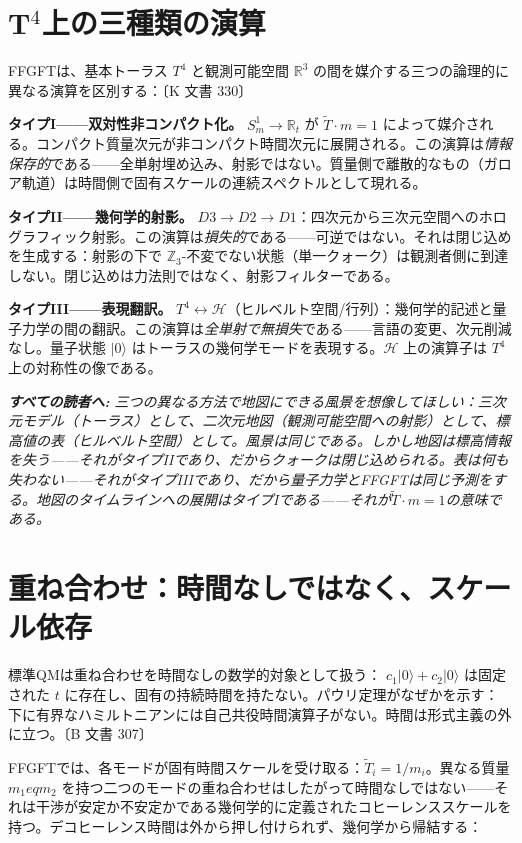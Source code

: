 \documentclass[11pt,openany]{book}
\newenvironment{laierspur}{%
  \par\vspace{4pt}%
  \noindent\small\itshape\color{blue!60!black}%
  \textbf{すべての読者へ:}\enspace\ignorespaces}{%
  \par\vspace{4pt}\normalsize\normalfont\normalcolor}
\begin{document}
\section*{T$^4$上の三種類の演算}

FFGFTは、基本トーラス $T^4$ と観測可能空間 $\mathbb{R}^3$ の間を媒介する三つの論理的に異なる演算を区別する：〔K 文書 330〕

\textbf{タイプI——双対性非コンパクト化。}
$S^1_m \to \mathbb{R}_t$ が $\tilde{T}\cdot m = 1$ によって媒介される。コンパクト質量次元が非コンパクト時間次元に展開される。この演算は\textit{情報保存的}である——全単射埋め込み、射影ではない。質量側で離散的なもの（ガロア軌道）は時間側で固有スケールの連続スペクトルとして現れる。

\textbf{タイプII——幾何学的射影。}
$D3 \to D2 \to D1$：四次元から三次元空間へのホログラフィック射影。この演算は\textit{損失的}である——可逆ではない。それは閉じ込めを生成する：射影の下で $\mathbb{Z}_3$-不変でない状態（単一クォーク）は観測者側に到達しない。閉じ込めは力法則ではなく、射影フィルターである。

\textbf{タイプIII——表現翻訳。}
$T^4 \leftrightarrow \mathcal{H}$（ヒルベルト空間/行列）：幾何学的記述と量子力学の間の翻訳。この演算は\textit{全単射で無損失}である——言語の変更、次元削減なし。量子状態 $|0\rangle$ はトーラスの幾何学モードを表現する。$\mathcal{H}$ 上の演算子は $T^4$ 上の対称性の像である。

\begin{laierspur}
三つの異なる方法で地図にできる風景を想像してほしい：三次元モデル（トーラス）として、二次元地図（観測可能空間への射影）として、標高値の表（ヒルベルト空間）として。風景は同じである。しかし地図は標高情報を失う——それがタイプIIであり、だからクォークは閉じ込められる。表は何も失わない——それがタイプIIIであり、だから量子力学とFFGFTは同じ予測をする。地図のタイムラインへの展開はタイプIである——それが$\tilde{T}\cdot m = 1$の意味である。
\end{laierspur}

\section*{重ね合わせ：時間なしではなく、スケール依存}

標準QMは重ね合わせを時間なしの数学的対象として扱う：
$c_1|0\rangle + c_2|0\rangle$ は固定された $t$ に存在し、固有の持続時間を持たない。パウリ定理がなぜかを示す：下に有界なハミルトニアンには自己共役時間演算子がない。時間は形式主義の外に立つ。〔B 文書 307〕

FFGFTでは、各モードが固有時間スケールを受け取る：$\tilde{T}_i = 1/m_i$。異なる質量 $m_1 
eq m_2$ を持つ二つのモードの重ね合わせはしたがって時間なしではない——それは干渉が安定か不安定かである幾何学的に定義されたコヒーレンススケールを持つ。デコヒーレンス時間は外から押し付けられず、幾何学から帰結する：
\end{document}
